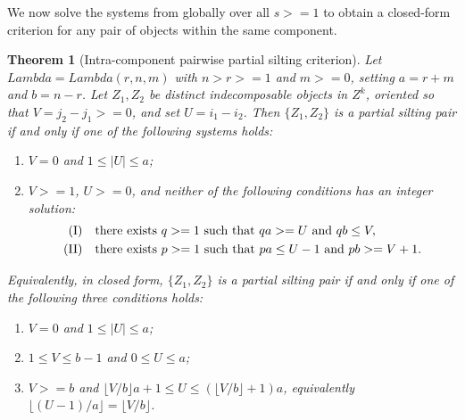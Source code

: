 \documentclass[11pt, a4paper]{article}
\newtheorem{theorem}{Theorem}[section]
\theoremstyle{definition}
\def\Lambda{Lambda}%
\def\ge{>=}%
\def\mathcal#1{#1}%
\begin{document}
We now solve the systems from  globally over all $s \ge 1$ to obtain a closed-form criterion for any pair of objects within the same component.

\begin{theorem}[Intra-component pairwise partial silting criterion]\label{thm:pairwise}
Let $\Lambda = \Lambda(r,n,m)$ with $n > r \ge 1$ and $m \ge 0$, setting $a = r+m$ and $b = n-r$. Let $Z_1, Z_2$ be distinct indecomposable objects in $\mathcal Z^k$, oriented so that $V = j_2 - j_1 \ge 0$, and set $U = i_1 - i_2$. Then $\{Z_1, Z_2\}$ is a partial silting pair if and only if one of the following systems holds:
\begin{enumerate}[label=\textup{(\Alph*)}]
  \item $V = 0$ and $1 \le |U| \le a$;
  \item $V \ge 1$, $U \ge 0$, and neither of the following conditions has an integer solution:
  \begin{align}
    \text{\textup{(I)}} &\quad \text{there exists } q \ge 1 \text{ such that } q a \ge U \text{ and } q b \le V, \label{eq:sys-I} \\
    \text{\textup{(II)}} &\quad \text{there exists } p \ge 1 \text{ such that } p a \le U - 1 \text{ and } p b \ge V + 1. \label{eq:sys-II}
  \end{align}
\end{enumerate}
Equivalently, in closed form, $\{Z_1, Z_2\}$ is a partial silting pair if and only if one of the following three conditions holds:
\begin{enumerate}[label=\textup{(\arabic*)}]
  \item[\textup{(A)}] $V = 0$ and $1 \le |U| \le a$;
  \item[\textup{(B1)}] $1 \le V \le b - 1$ and $0 \le U \le a$;
  \item[\textup{(B2)}] $V \ge b$ and $\lfloor V/b \rfloor a + 1 \le U \le (\lfloor V/b \rfloor + 1)a$, equivalently $\lfloor (U-1)/a \rfloor = \lfloor V/b \rfloor$.
\end{enumerate}
\end{theorem}
\end{document}
